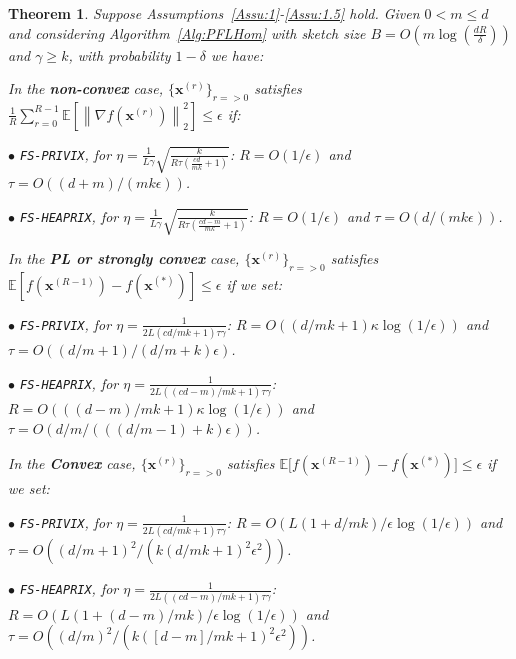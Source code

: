\documentclass{article} %
\newtheorem{theorem}{Theorem}
\begin{document}
\begin{theorem}\label{thm:homog_case}
Suppose Assumptions~\ref{Assu:1}-\ref{Assu:1.5} hold. 
Given $0<m\leq d$ and considering Algorithm~\ref{Alg:PFLHom} with sketch size $B=O\left(m\log\left(\frac{d R}{\delta}\right)\right)$ and $\gamma\geq k$, with probability $1-\delta$ we have: 

In the \textbf{non-convex} case, $\{ {\boldsymbol{x}}^{(r)}\}_{r=>0}$ satisfies  $\frac{1}{R}\sum_{r=0}^{R-1}\mathbb{E}\left[\left\|\nabla f({\boldsymbol{x}}^{(r)})\right\|_2^2\right]\leq {\epsilon}$ if: 
 
\noindent $\bullet$ \texttt{FS-PRIVIX}, for $\eta=\frac{1}{L\gamma}\sqrt{\frac{k}{R\tau\left(\frac{c d}{m k}+1\right)}}$: $R=O\left(1/\epsilon\right)$ and $\tau=O\left(( d+m)/(mk\epsilon)\right)$.

\noindent $\bullet$ \texttt{FS-HEAPRIX}, for $\eta=\frac{1}{L\gamma}\sqrt{\frac{k}{R\tau\left(\frac{cd-m}{mk}+1\right)}}$: $R=O\left(1/\epsilon\right)$ and $\tau=O\left(d/(mk\epsilon)\right)$.

In the \textbf{PL or strongly convex} case, $\{ {\boldsymbol{x}}^{(r)}\}_{r=>0}$ satisfies $\mathbb{E}[f({\boldsymbol{x}}^{(R-1)})-f({\boldsymbol{x}}^{(*)})]\leq \epsilon$ if  we set:  

\noindent $\bullet$ \texttt{FS-PRIVIX}, for $\eta=\frac{1}{2L(cd/mk+1)\tau\gamma}$: $R=O\left(\left(d/mk+1\right)\kappa\log\left(1/\epsilon\right)\right)$ and $\tau=O\left((d/m+1)\Big/\left(d/m+k\right)\epsilon\right)$.

\noindent $\bullet$ \texttt{FS-HEAPRIX}, for $\eta=\frac{1}{2L\left((cd-m)/mk+1\right)\tau\gamma}$: $R = O\left(\left((d-m)/mk+1\right)\kappa\log\left(1/\epsilon\right)\right)$ and $ \tau =O\left(d/m\Big/\left(\left((d/m-1)+k\right)\epsilon\right)\right)$.


In the \textbf{Convex} case, $\{ {\boldsymbol{x}}^{(r)}\}_{r=>0}$ satisfies $ \mathbb{E}\Big[f({\boldsymbol{x}}^{(R-1)})-f({\boldsymbol{x}}^{(*)})\Big]\leq \epsilon$ if we set:  

\noindent $\bullet$ \texttt{FS-PRIVIX}, for $\eta=\frac{1}{2L(cd/mk+1)\tau\gamma}$: $R =O\left(L\left(1+d/mk\right)/\epsilon\log\left(1/\epsilon \right)\right)$ and
$\tau=O\left(\left(d/m+1\right)^2/(k\left(d/m k+1\right)^2\epsilon^2)\right)$.

\noindent $\bullet$ \texttt{FS-HEAPRIX}, for $\eta=\frac{1}{2L\left((cd-m)/mk+1\right)\tau\gamma}$:   $R =O\left(L\left(1+(d-m)/mk\right)/\epsilon\log\left(1/\epsilon \right)\right)$ and $\tau=O\left((d/m)^2/\left(k\left([d-m]/mk+1\right)^2\epsilon^2\right)\right)$.
\end{theorem}
\end{document}
